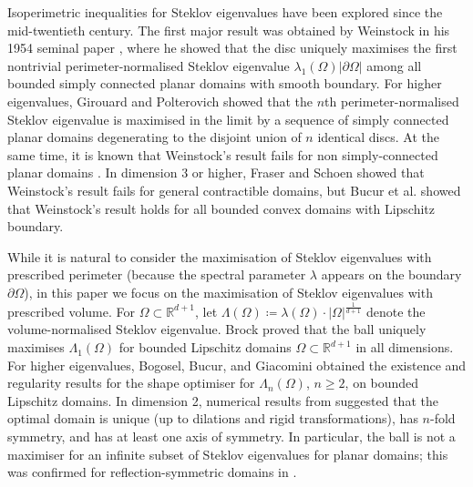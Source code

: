 \documentclass[11pt]{amsart}
\theoremstyle{definition}
\theoremstyle{plain}
\theoremstyle{remark}
\newcommand{\R}{\mathbb{R}}
\newcommand{\del}{\partial}
\newcommand{\abs}[1]{\lvert{#1}\rvert}
\begin{document}
Isoperimetric inequalities for Steklov eigenvalues have been explored since the mid-twentieth century. The first major result was obtained by Weinstock in his 1954 seminal paper \cite{weinstock1954}, where he showed that the disc uniquely maximises the first nontrivial perimeter-normalised Steklov eigenvalue $\lambda_1(\Omega)\abs{\del\Omega}$ among all bounded simply connected planar domains with smooth boundary. For higher eigenvalues, Girouard and Polterovich showed that the $n$th perimeter-normalised Steklov eigenvalue is maximised in the limit by a sequence of simply connected planar domains degenerating to the disjoint union of $n$ identical discs. At the same time, it is known that Weinstock's result fails for non simply-connected planar domains \cite[Example 4.2.5]{girouard2017}. In dimension 3 or higher, Fraser and Schoen \cite{fraser2019} showed that Weinstock's result fails for general contractible domains, but Bucur et al. \cite[Theorem 3.1]{bucur2021} showed that Weinstock's result holds for all bounded convex domains with Lipschitz boundary. 

While it is natural to consider the maximisation of Steklov eigenvalues with prescribed perimeter (because the spectral parameter $\lambda$ appears on the boundary $\del\Omega$), in this paper we focus on the maximisation of Steklov eigenvalues with prescribed volume. For $\Omega\subset\R^{d + 1}$, let $\Lambda(\Omega)\coloneqq \lambda(\Omega)\cdot\abs{\Omega}^{\frac{1}{d + 1}}$ denote the volume-normalised Steklov eigenvalue. Brock proved that the ball uniquely maximises $\Lambda_1(\Omega)$ for bounded Lipschitz domains $\Omega\subset\R^{d + 1}$ in all dimensions. For higher eigenvalues, Bogosel, Bucur, and Giacomini \cite{bogosel2017} obtained the existence and regularity results for the shape optimiser for $\Lambda_n(\Omega)$, $n\ge 2$, on bounded Lipschitz domains. In dimension 2, numerical results from \cite{bogosel2016, bogosel2017, akhmetgaliyev2017} suggested that the optimal domain is unique (up to dilations and rigid  transformations), has $n$-fold symmetry, and has at least one axis of symmetry. In particular, the ball is not a maximiser for an infinite subset of Steklov eigenvalues for planar domains; this was confirmed for reflection-symmetric domains in \cite{viator2018}. 
\end{document}
